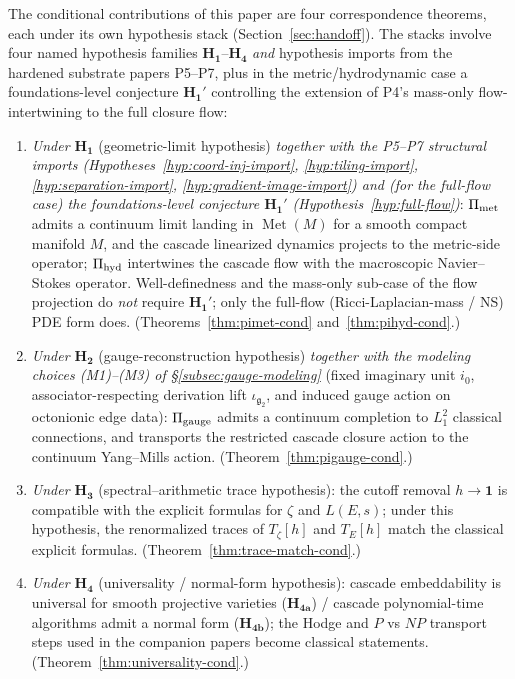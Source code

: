 \documentclass[11pt, a4paper]{amsart}
\theoremstyle{definition}
\newcommand{\met}{{\rm met}}
\newcommand{\hyd}{{\rm hyd}}
\newcommand{\gge}{{\rm gauge}}
\newcommand{\Met}{\operatorname{Met}}
\begin{document}
The conditional contributions of this paper are four
correspondence theorems, each under its own hypothesis stack
(Section~\ref{sec:handoff}). The stacks involve four named
hypothesis families $\mathbf{H_1}$--$\mathbf{H_4}$ \emph{and}
hypothesis imports from the hardened substrate papers P5--P7,
plus in the metric/hydrodynamic case a foundations-level
conjecture $\mathbf{H_1'}$ controlling the extension of P4's
mass-only flow-intertwining to the full closure flow:
\begin{enumerate}[label=(C\arabic*)]
\item \emph{Under $\mathbf{H_1}$} (geometric-limit hypothesis)
  \emph{together with the P5--P7 structural imports
  (Hypotheses~\ref{hyp:coord-inj-import}, \ref{hyp:tiling-import},
  \ref{hyp:separation-import}, \ref{hyp:gradient-image-import})
  and (for the full-flow case) the foundations-level conjecture
  $\mathbf{H_1'}$ (Hypothesis~\ref{hyp:full-flow})}:
  $\Pi_{\met}$ admits a continuum limit landing in $\Met(M)$ for
  a smooth compact manifold $M$, and the cascade linearized
  dynamics projects to the metric-side operator; $\Pi_{\hyd}$
  intertwines the cascade flow with the macroscopic Navier--Stokes
  operator. Well-definedness and the mass-only sub-case of the
  flow projection do \emph{not} require $\mathbf{H_1'}$; only
  the full-flow (Ricci-Laplacian-mass / NS) PDE form does.
  (Theorems~\ref{thm:pimet-cond} and~\ref{thm:pihyd-cond}.)
\item \emph{Under $\mathbf{H_2}$} (gauge-reconstruction hypothesis)
  \emph{together with the modeling choices (M1)--(M3) of
  \S\ref{subsec:gauge-modeling}} (fixed imaginary unit $i_0$,
  associator-respecting derivation lift $\iota_{\mathfrak{g}_2}$,
  and induced gauge action on octonionic edge data):
  $\Pi_{\gge}$ admits a continuum completion to $L^2_1$ classical
  connections, and transports the restricted cascade closure action
  to the continuum Yang--Mills action. (Theorem~\ref{thm:pigauge-cond}.)
\item \emph{Under $\mathbf{H_3}$} (spectral--arithmetic trace
  hypothesis): the cutoff removal $h \to \mathbf{1}$ is compatible
  with the explicit formulas for $\zeta$ and $L(E, s)$; under this
  hypothesis, the renormalized traces of $T_\zeta[h]$ and $T_E[h]$
  match the classical explicit formulas.
  (Theorem~\ref{thm:trace-match-cond}.)
\item \emph{Under $\mathbf{H_4}$} (universality / normal-form
  hypothesis): cascade embeddability is universal for smooth
  projective varieties ($\mathbf{H_{4a}}$) / cascade polynomial-time
  algorithms admit a normal form ($\mathbf{H_{4b}}$); the Hodge and
  $P$ vs $NP$ transport steps used in the companion papers become
  classical statements. (Theorem~\ref{thm:universality-cond}.)
\end{enumerate}
\end{document}
